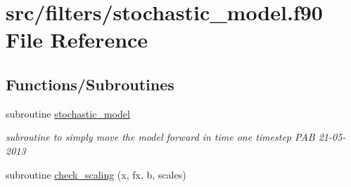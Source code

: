 \hypertarget{stochastic__model_8f90}{\section{src/filters/stochastic\-\_\-model.f90 File Reference}
\label{stochastic__model_8f90}
}
\subsection*{Functions/\-Subroutines}
\begin{DoxyCompactItemize}
\item 
subroutine \hyperlink{stochastic__model_8f90_ac824cdcc59bee27acef82df04a13e009}{stochastic\-\_\-model}
\begin{DoxyCompactList}\small\item\em subroutine to simply move the model forward in time one timestep P\-A\-B 21-\/05-\/2013 \end{DoxyCompactList}\item 
subroutine \hyperlink{stochastic__model_8f90_ae9b3f95267714a4c3991f2a1e6f85ded}{check\-\_\-scaling} (x, fx, b, scales)
\end{DoxyCompactItemize}


